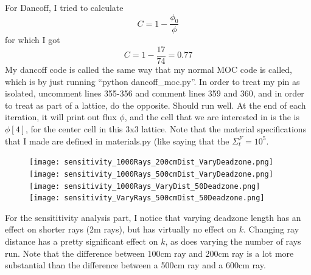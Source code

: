 \documentclass[a4paper]{article}
\begin{document}
For Dancoff, I tried to calculate 
\[C=1-\frac{\phi_0}{\phi}\]
for which I got 
\[C=1-\frac{17}{74}=0.77\]
My dancoff code is called the same way that my normal MOC code is called, which is by just running ``python dancoff\_moc.py''. In order to treat my pin as isolated, uncomment lines 355-356 and comment lines 359 and 360, and in order to treat as part of a lattice, do the opposite. Should run well. At the end of each iteration, it will print out flux $\phi$, and the cell that we are interested in is the is $\phi[4]$, for the center cell in this 3x3 lattice. Note that the material specifications that I made are defined in materials.py (like saying that the $\Sigma_t^F=10^5$.






\begin{figure}[H]
\centering
\texttt{[image: sensitivity\_1000Rays\_200cmDist\_VaryDeadzone.png]}
\texttt{[image: sensitivity\_1000Rays\_500cmDist\_VaryDeadzone.png]}
\texttt{[image: sensitivity\_1000Rays\_VaryDist\_50Deadzone.png]}
\texttt{[image: sensitivity\_VaryRays\_500cmDist\_50Deadzone.png]}
  \caption{\label{fig:fig1}} 
\end{figure}
For the sensititivity analysis part, I notice that varying deadzone length has an effect on shorter rays (2m rays), but has virtually no effect on $k$. Changing ray distance has a pretty significant effect on $k$, as does varying the number of rays run. Note that the difference between 100cm ray and 200cm ray is a lot more substantial than the difference between a 500cm ray and a 600cm ray.



%
\end{document}
